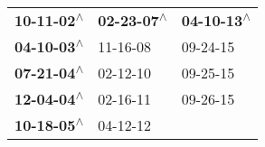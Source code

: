 \begin{supertabular}{lll}
 \textbf{10-11-02\textsuperscript{$\wedge$}} &  \textbf{02-23-07\textsuperscript{$\wedge$}} &  \textbf{04-10-13\textsuperscript{$\wedge$}} \\
 \textbf{04-10-03\textsuperscript{$\wedge$}} &                   11-16-08\textsuperscript{} &                   09-24-15\textsuperscript{} \\
 \textbf{07-21-04\textsuperscript{$\wedge$}} &                   02-12-10\textsuperscript{} &                   09-25-15\textsuperscript{} \\
 \textbf{12-04-04\textsuperscript{$\wedge$}} &                   02-16-11\textsuperscript{} &                   09-26-15\textsuperscript{} \\
 \textbf{10-18-05\textsuperscript{$\wedge$}} &                   04-12-12\textsuperscript{} &                                              \\
\end{supertabular}
